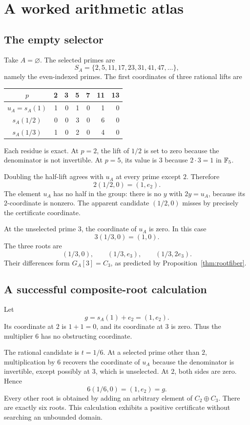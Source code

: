 \chapter{A worked arithmetic atlas}
\label{ch:atlas}

\section{The empty selector}
Take $A=\varnothing$. The selected primes are
\[
S_A=\{2,5,11,17,23,31,41,47,\ldots\},
\]
namely the even-indexed primes. The first coordinates of three rational lifts are
\begin{center}
\begin{tabular}{@{}crrrrrr@{}}
\toprule
$p$&2&3&5&7&11&13\\\midrule
$u_A=s_A(1)$&1&0&1&0&1&0\\
$s_A(1/2)$&0&0&3&0&6&0\\
$s_A(1/3)$&1&0&2&0&4&0\\\bottomrule
\end{tabular}
\end{center}
Each residue is exact. At $p=2$, the lift of $1/2$ is set to zero because the denominator is not invertible. At $p=5$, its value is $3$ because $2\cdot3=1$ in $\mathbb F_5$.

Doubling the half-lift agrees with $u_A$ at every prime except $2$. Therefore
\[
2(1/2,0)=(1,e_2).
\]
The element $u_A$ has no half in the group: there is no $y$ with $2y=u_A$, because its $2$-coordinate is nonzero. The apparent candidate $(1/2,0)$ misses by precisely the certificate coordinate.

At the unselected prime $3$, the coordinate of $u_A$ is zero. In this case
\[
3(1/3,0)=(1,0).
\]
The three roots are
\[
(1/3,0),\qquad(1/3,e_3),\qquad(1/3,2e_3).
\]
Their differences form $G_A[3]=C_3$, as predicted by Proposition~\ref{thm:rootfiber}.

\section{A successful composite-root calculation}
Let
\[
g=s_A(1)+e_2=(1,e_2).
\]
Its coordinate at $2$ is $1+1=0$, and its coordinate at $3$ is zero. Thus the multiplier $6$ has no obstructing coordinate.

The rational candidate is $t=1/6$. At a selected prime other than $2$, multiplication by $6$ recovers the coordinate of $u_A$ because the denominator is invertible, except possibly at $3$, which is unselected. At $2$, both sides are zero. Hence
\[
6(1/6,0)=(1,e_2)=g.
\]
Every other root is obtained by adding an arbitrary element of $C_2\oplus C_3$. There are exactly six roots. This calculation exhibits a positive certificate without searching an unbounded domain.

